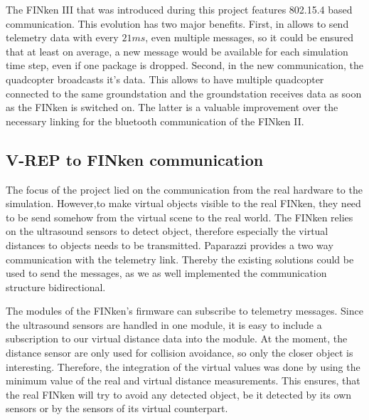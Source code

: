 The FINken III that was introduced during this project features 802.15.4 based communication.
This evolution has two major benefits.
First, in allows to send telemetry data with every $21ms$, even multiple messages, so it could be ensured that at least on average, a new message would be available for each simulation time step, even if one package is dropped.
Second, in the new communication, the quadcopter broadcasts it's data.
This allows to have multiple quadcopter connected to the same groundstation and the groundstation receives data as soon as the FINken is switched on.
The latter is a valuable improvement over the necessary linking for the bluetooth communication of the FINken II.



\subsection{V-REP to FINken communication}
The focus of the project lied on the communication from the real hardware to the simulation.
However,to make virtual objects visible to the real FINken, they need to be send somehow from the virtual scene to the real world.
The FINken relies on the ultrasound sensors to detect object, therefore especially the virtual distances to objects needs to be transmitted.
Paparazzi provides a two way communication with the telemetry link.
Thereby the existing solutions could be used to send the messages, as we as well implemented the communication structure bidirectional.

The modules of the FINken's firmware can subscribe to telemetry messages.
Since the ultrasound sensors are handled in one module, it is easy to include a subscription to our virtual distance data into the module.
At the moment, the distance sensor are only used for collision avoidance, so only the closer object is interesting.
Therefore, the integration of the virtual values was done by using the minimum value of the real and virtual distance measurements.
This ensures, that the real FINken will try to avoid any detected object, be it detected by its own sensors or by the sensors of its virtual counterpart.



